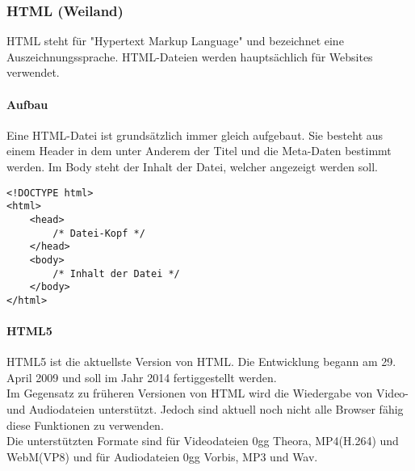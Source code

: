 \subsubsection{HTML (Weiland)}

HTML steht für "Hypertext Markup Language" und bezeichnet eine Auszeichnungssprache. HTML-Dateien werden hauptsächlich für Websites verwendet.


\paragraph{Aufbau}

Eine HTML-Datei ist grundsätzlich immer gleich aufgebaut. Sie besteht aus einem Header in dem unter Anderem der Titel und die Meta-Daten bestimmt werden.
Im Body steht der Inhalt der Datei, welcher angezeigt werden soll. 
\begin{lstlisting}[style=HTML, caption={HTML-Tags}]
<!DOCTYPE html>
<html> 
	<head>
		/* Datei-Kopf */
	</head>
	<body>
		/* Inhalt der Datei */
	</body>
</html>
\end{lstlisting}

\paragraph{HTML5}
HTML5 ist die aktuellste Version von HTML. Die Entwicklung begann am 29. April 2009 und soll im Jahr 2014 fertiggestellt werden.\\
Im Gegensatz zu früheren Versionen von HTML wird die Wiedergabe von Video- und Audiodateien unterstützt. Jedoch sind aktuell noch nicht alle Browser fähig diese Funktionen zu verwenden.\\
Die unterstützten Formate sind für Videodateien 0gg Theora, MP4(H.264) und WebM(VP8) und für Audiodateien 0gg Vorbis, MP3 und Wav. \\
